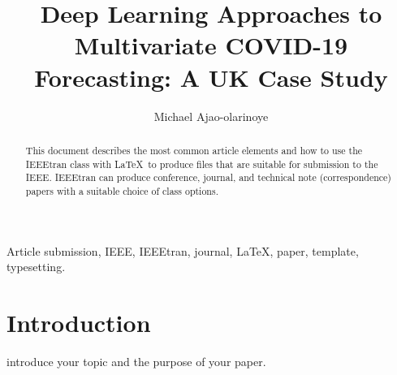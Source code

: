 \documentclass[lettersize, journal]{IEEEtran}
\begin{document}
\title{Deep Learning Approaches to Multivariate COVID-19 Forecasting: A UK Case Study}
\author{Michael Ajao-olarinoye}

\maketitle
\thispagestyle{empty}


\begin{abstract}
    This document describes the most common article elements and how to use the IEEEtran class with \LaTeX \ to produce files that are suitable for submission to the IEEE.  IEEEtran can produce conference, journal, and technical note (correspondence) papers with a suitable choice of class options.
\end{abstract}

\begin{IEEEkeywords}
    Article submission, IEEE, IEEEtran, journal, \LaTeX, paper, template, typesetting.
\end{IEEEkeywords}

\section{Introduction}
 introduce your topic and the purpose of your paper.


\printbibliography
\end{document}
